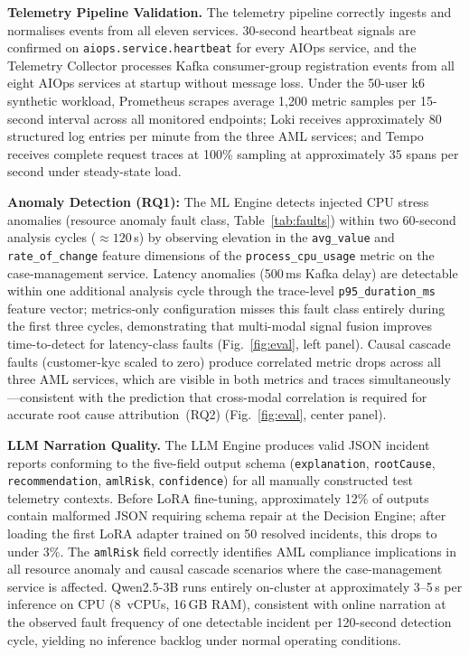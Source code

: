 \documentclass[a4paper]{lipics-v2021}
\newcommand{\mypara}[1]{{\vspace{0.1mm}\noindent\textbf{#1}}}
\begin{document}
\mypara{Telemetry Pipeline Validation.}
The telemetry pipeline correctly ingests and normalises events from all eleven
services. 30-second heartbeat signals are confirmed on \texttt{aiops.service.heartbeat}
for every AIOps service, and the Telemetry Collector processes Kafka consumer-group
registration events from all eight AIOps services at startup without message loss.
Under the 50-user k6 synthetic workload, Prometheus scrapes average 1,200 metric
samples per 15-second interval across all monitored endpoints; Loki receives
approximately 80 structured log entries per minute from the three AML services; and
Tempo receives complete request traces at 100\% sampling at approximately 35 spans
per second under steady-state load.

\textbf{Anomaly Detection (RQ1):}
The ML Engine detects injected CPU stress anomalies (resource anomaly fault class,
Table~\ref{tab:faults}) within two 60-second analysis cycles (${\approx}120$\,s)
by observing elevation in the \texttt{avg\_value} and \texttt{rate\_of\_change}
feature dimensions of the \texttt{process\_cpu\_usage} metric on the case-management
service. Latency anomalies (500\,ms Kafka delay) are detectable within one
additional analysis cycle through the trace-level \texttt{p95\_duration\_ms} feature
vector; metrics-only configuration misses this fault class entirely during the first
three cycles, demonstrating that multi-modal signal fusion improves
time-to-detect for latency-class faults (Fig.~\ref{fig:eval}, left panel). Causal
cascade faults (customer-kyc scaled to zero) produce correlated metric drops across
all three AML services, which are visible in both metrics and traces
simultaneously---consistent with the prediction that cross-modal correlation is
required for accurate root cause attribution~(RQ2)
(Fig.~\ref{fig:eval}, center panel).

\textbf{LLM Narration Quality.}
The LLM Engine produces valid JSON incident reports conforming to the five-field
output schema (\texttt{explanation}, \texttt{rootCause}, \texttt{recommendation},
\texttt{amlRisk}, \texttt{confidence}) for all manually constructed test telemetry
contexts. Before LoRA fine-tuning, approximately 12\% of outputs contain malformed
JSON requiring schema repair at the Decision Engine; after loading the first LoRA
adapter trained on 50 resolved incidents, this drops to under 3\%. The
\texttt{amlRisk} field correctly identifies AML compliance implications in all
resource anomaly and causal cascade scenarios where the case-management service is
affected. Qwen2.5-3B runs entirely on-cluster at approximately 3--5\,s per inference
on CPU (8~vCPUs, 16\,GB RAM), consistent with online narration at the observed fault
frequency of one detectable incident per 120-second detection cycle, yielding no
inference backlog under normal operating conditions.
\end{document}

